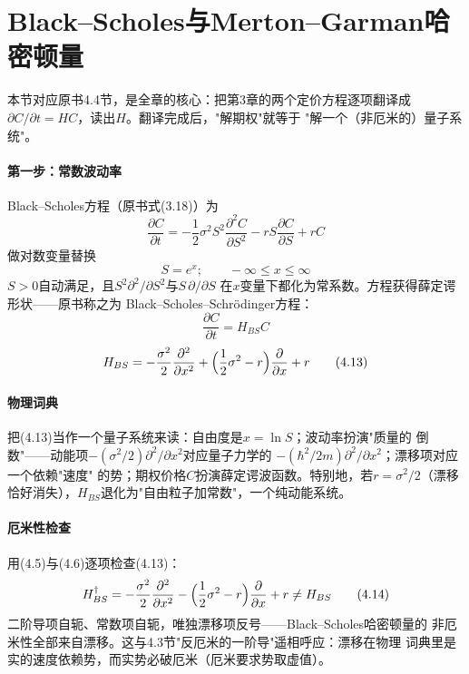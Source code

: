 \section{Black--Scholes与Merton--Garman哈密顿量}

本节对应原书4.4节，是全章的核心：把第3章的两个定价方程逐项翻译成
$\partial C/\partial t=HC$，读出$H$。翻译完成后，"解期权"就等于
"解一个（非厄米的）量子系统"。

\paragraph{第一步：常数波动率}
Black--Scholes方程（原书式(3.18)）为
\begin{equation*}
\frac{\partial C}{\partial t}
=-\frac{1}{2}\sigma^{2}S^{2}\frac{\partial^{2}C}{\partial S^{2}}
-rS\frac{\partial C}{\partial S}+rC
\tag{4.11}
\end{equation*}
做对数变量替换
\begin{equation*}
S=e^{x};\qquad -\infty\leq x\leq\infty
\end{equation*}
$S>0$自动满足，且$S^{2}\partial^{2}/\partial S^{2}$与$S\,\partial/\partial S$
在$x$变量下都化为常系数。方程获得薛定谔形状——原书称之为
Black--Scholes--Schr\"odinger方程：
\begin{equation*}
\frac{\partial C}{\partial t}=H_{BS}C
\tag{4.12}
\end{equation*}
\begin{equation*}
H_{BS}=-\frac{\sigma^{2}}{2}\frac{\partial^{2}}{\partial x^{2}}
+\Bigl(\frac{1}{2}\sigma^{2}-r\Bigr)\frac{\partial}{\partial x}+r
\tag{4.13}
\end{equation*}

\paragraph{物理词典}
把(4.13)当作一个量子系统来读：自由度是$x=\ln S$；波动率扮演"质量的
倒数"——动能项$-(\sigma^{2}/2)\partial^{2}/\partial x^{2}$对应量子力学的
$-(\hbar^{2}/2m)\partial^{2}/\partial x^{2}$；漂移项对应一个依赖"速度"
的势；期权价格$C$扮演薛定谔波函数。特别地，若$r=\sigma^{2}/2$（漂移
恰好消失），$H_{BS}$退化为"自由粒子加常数"，一个纯动能系统。

\paragraph{厄米性检查}
用(4.5)与(4.6)逐项检查(4.13)：
\begin{equation*}
H_{BS}^{\dagger}
=-\frac{\sigma^{2}}{2}\frac{\partial^{2}}{\partial x^{2}}
-\Bigl(\frac{1}{2}\sigma^{2}-r\Bigr)\frac{\partial}{\partial x}+r
\neq H_{BS}
\tag{4.14}
\end{equation*}
二阶导项自轭、常数项自轭，唯独漂移项反号——Black--Scholes哈密顿量的
非厄米性全部来自漂移。这与4.3节"反厄米的一阶导"遥相呼应：漂移在物理
词典里是实的速度依赖势，而实势必破厄米（厄米要求势取虚值）。


